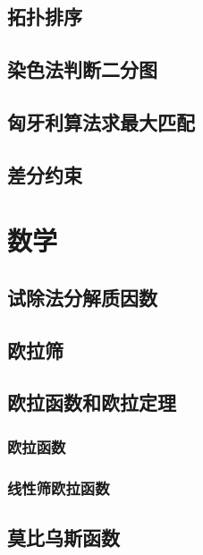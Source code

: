 \documentclass[10pt,a4paper]{article}
\begin{document}
\subsection{拓扑排序}

\subsection{染色法判断二分图}

\subsection{匈牙利算法求最大匹配}

\subsection{差分约束}
\begin{spacing}{1.5}

\end{spacing}

\section{数学}
\subsection{试除法分解质因数}

\subsection{欧拉筛}

\subsection{欧拉函数和欧拉定理}
\subsubsection{欧拉函数}
\begin{spacing}{1.5}

\end{spacing}

\subsubsection{线性筛欧拉函数}

\subsection{莫比乌斯函数}
\begin{spacing}{1.5}

\end{spacing}

\end{document}

